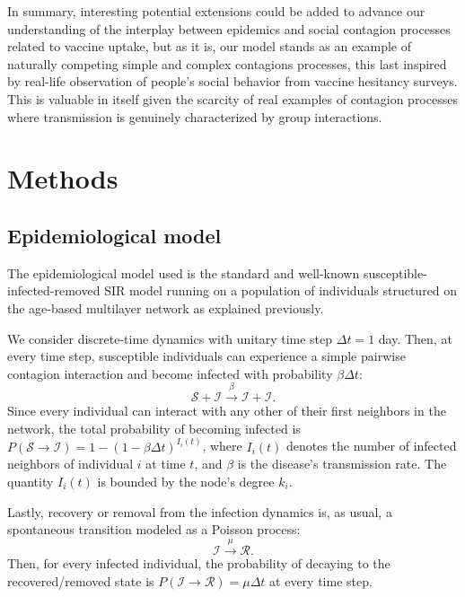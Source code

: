 \documentclass[
 reprint,
 amsmath,amssymb,
 aps,
]{revtex4-2}
\begin{document}
In summary, interesting potential extensions could be added to advance our understanding of the interplay between epidemics and social contagion processes related to vaccine uptake, but as it is, our model stands as an example of naturally competing simple and complex contagions processes, this last inspired by real-life observation of people's social behavior from vaccine hesitancy surveys. This is valuable in itself given the scarcity of real examples of contagion processes where transmission is genuinely characterized by group interactions.

\section{Methods}
\label{sec:methods}

\subsection{Epidemiological model}
\label{subsec:epidemic}

The epidemiological model used is the standard and well-known susceptible-infected-removed SIR model running on a population of individuals structured on the age-based multilayer network as explained previously. 

We consider discrete-time dynamics with unitary time step $\Delta t=1$ day. Then, at every time step, susceptible individuals can experience a simple pairwise contagion interaction and become infected with probability $\beta\Delta t$:
\begin{equation}
\mathcal{S}+\mathcal{I}\xrightarrow{\beta}\mathcal{I}+\mathcal{I}.
\end{equation}
Since every individual can interact with any other of their first neighbors in the network, the total probability of becoming infected is $P(\mathcal{S}\to\mathcal{I})=1-(1-\beta\Delta t)^{I_i(t)}$, where $I_i(t)$ denotes the number of infected neighbors of individual $i$ at time $t$, and $\beta$ is the disease's transmission rate. The quantity $I_i(t)$ is bounded by the node's degree $k_i$. 

Lastly, recovery or removal from the infection dynamics is, as usual, a spontaneous transition modeled as a Poisson process:
\begin{equation}
\mathcal{I}\xrightarrow{\mu}\mathcal{R}.
\end{equation}
Then, for every infected individual, the probability of decaying to the recovered/removed state is $P(\mathcal{I}\to\mathcal{R})=\mu\Delta t$ at every time step.
\end{document}

